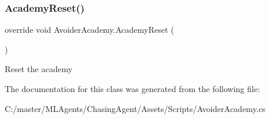 \subsubsection{\texorpdfstring{AcademyReset()}{AcademyReset()}}
{\footnotesize\ttfamily override void Avoider\+Academy.\+Academy\+Reset (\begin{DoxyParamCaption}{ }\end{DoxyParamCaption})}



Reset the academy 



The documentation for this class was generated from the following file\+:\begin{DoxyCompactItemize}
\item 
C\+:/master/\+M\+L\+Agents/\+Chasing\+Agent/\+Assets/\+Scripts/Avoider\+Academy.\+cs\end{DoxyCompactItemize}
